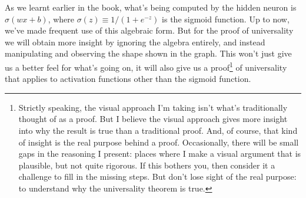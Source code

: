 \documentclass[a4paper,twoside,10pt]{book}
\begin{document}
As we learnt earlier in the book, what's being computed by the hidden neuron is $\sigma(wx+b)$, where $\sigma(z)\equiv1/(1+e^{-z})$ is the sigmoid function. Up to now, we've made frequent use of this algebraic form. But for the proof of universality we will obtain more insight by ignoring the algebra entirely, and instead manipulating and observing the shape shown in the graph. This won't just give us a better feel for what's going on, it will also give us a proof\footnote{Strictly speaking, the visual approach I'm taking isn't what's traditionally thought of as a proof. But I believe the visual approach gives more insight into why the result is true than a traditional proof. And, of course, that kind of insight is the real purpose behind a proof. Occasionally, there will be small gaps in the reasoning I present: places where I make a visual argument that is plausible, but not quite rigorous. If this bothers you, then consider it a challenge to fill in the missing steps. But don't lose sight of the real purpose: to understand why the universality theorem is true.} of universality that applies to activation functions other than the sigmoid function.
%
%
%
%
%
%
%
%
%
\end{document}
